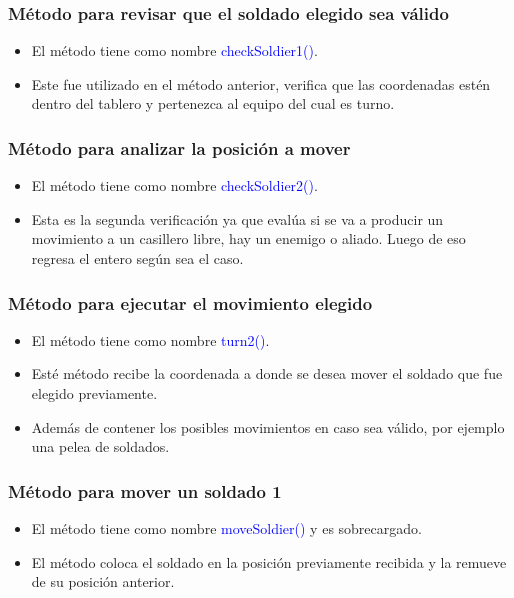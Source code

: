 \documentclass{article}
\begin{document}
\subsubsection{Método para revisar que el soldado elegido sea válido}
\begin{itemize}
    \item El método tiene como nombre \textcolor{blue}{checkSoldier1()}.
    \item Este fue utilizado en el método anterior, verifica que las coordenadas estén dentro del tablero y pertenezca al equipo del cual es turno.
\end{itemize}



\subsubsection{Método para analizar la posición a mover}
\begin{itemize}
    \item El método tiene como nombre \textcolor{blue}{checkSoldier2()}.
    \item Esta es la segunda verificación ya que evalúa si se va a producir un movimiento a un casillero libre, hay un enemigo o aliado. Luego de eso regresa el entero según sea el caso.
\end{itemize}



\subsubsection{Método para ejecutar el movimiento elegido}
\begin{itemize}
    \item El método tiene como nombre \textcolor{blue}{turn2()}.
    \item Esté método recibe la coordenada a donde se desea mover el soldado que fue elegido previamente.
    \item Además de contener los posibles movimientos en caso sea válido, por ejemplo una pelea de soldados.
\end{itemize}



\subsubsection{Método para mover un soldado 1}
\begin{itemize}
    \item El método tiene como nombre \textcolor{blue}{moveSoldier()} y es sobrecargado.
    \item El método coloca el soldado en la posición previamente recibida y la remueve de su posición anterior.
\end{itemize}

\end{document}
